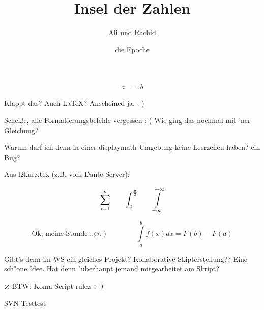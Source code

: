 \documentclass{scrartcl}
\title{Insel der Zahlen}
\author{Ali und Rachid}
\date{die Epoche}
\begin{document}

\maketitle

\begin{align}
a&=b
\end{align}

Klappt das? Auch \LaTeX{}? Anscheined ja. :-)

Scheiße, alle Formatierungsbefehle vergessen :-(
\newline
Wie ging das nochmal mit 'ner Gleichung?

Warum darf ich denn in einer displaymath-Umgebung keine Leerzeilen haben? ein Bug?

Aus l2kurz.tex (z.B. vom Dante-Server):

\begin{displaymath}
\sum_{i=1}^{n} \qquad
\int_{0}^{\frac{\pi}{2}} \qquad
\int \limits_{-\infty}^{+\infty}\\
\end{displaymath}

\begin{displaymath}
\textrm{Ok, meine Stunde}\ldots \varnothing \texttt{:-)} \qquad \  \qquad
\int \limits_{a}^{b} f(x) d x = F(b) - F(a)
\end{displaymath}

Gibt's denn im WS ein gleiches Projekt? Kollaborative Skipterstellung?? Eine sch"one Idee. Hat denn "uberhaupt jemand mitgearbeitet am Skript?

$ \varnothing $
BTW: Koma-Script rulez \texttt{:-)}

\begin{xy}
\end{xy}

SVN-Testtest
\end{document}

